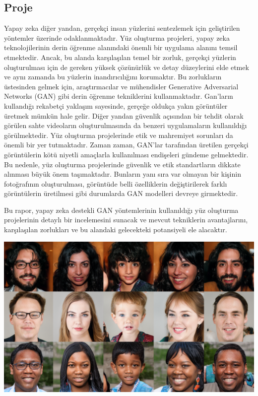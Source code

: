 \documentclass[12pt, a4paper]{article}
\begin{document}
		\subsection{Proje}
		Yapay zeka diğer yandan, gerçekçi insan yüzlerini sentezlemek için geliştirilen yöntemler üzerinde odaklanmaktadır. Yüz oluşturma projeleri, yapay zeka teknolojilerinin derin öğrenme alanındaki önemli bir uygulama alanını temsil etmektedir. Ancak, bu alanda karşılaşılan temel bir zorluk, gerçekçi yüzlerin oluşturulması için de gereken yüksek çözünürlük ve detay düzeylerini elde etmek ve aynı zamanda bu yüzlerin inandırıcılığını korumaktır. Bu zorlukların üstesinden gelmek için, araştırmacılar ve mühendisler Generative Adversarial Networks (GAN) gibi derin öğrenme tekniklerini kullanmaktadır. Gan'ların kullandığı rekabetçi yaklaşım sayesinde, gerçeğe oldukça yakın görüntüler üretmek mümkün hale gelir. Diğer yandan güvenlik açısından bir tehdit olarak görülen sahte videoların oluşturulmasında da benzeri uygulamaların kullanıldığı görülmektedir\cite{masood2023deepfakes}. Yüz oluşturma projelerinde etik ve mahremiyet sorunları da önemli bir yer tutmaktadır. Zaman zaman, GAN'lar tarafından üretilen gerçekçi görüntülerin kötü niyetli amaçlarla kullanılması endişeleri gündeme gelmektedir. Bu nedenle, yüz oluşturma projelerinde güvenlik ve etik standartların dikkate alınması büyük önem taşımaktadır. Bunların yanı sıra var olmayan bir kişinin fotoğrafının oluşturulması, görüntüde belli	özelliklerin değiştirilerek farklı görüntülerin	üretilmesi gibi durumlarda GAN modelleri devreye girmektedir. 
		
		Bu rapor, yapay zeka destekli GAN yöntemlerinin kullanıldığı yüz oluşturma projelerinin detaylı bir incelemesini sunacak ve mevcut tekniklerin avantajlarını, karşılaşılan zorlukları ve bu alandaki gelecekteki potansiyeli ele alacaktır.
	
		\includegraphics[width=1\textwidth]{abcd}
\end{document}
